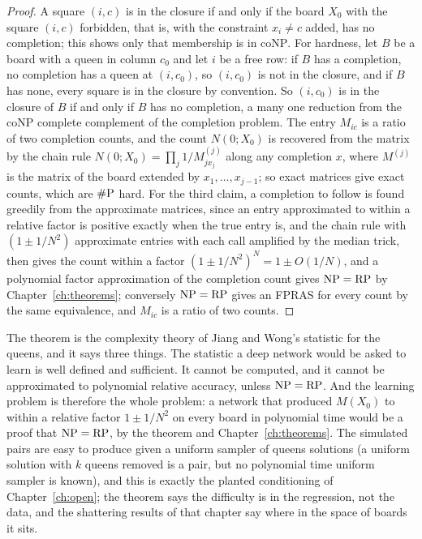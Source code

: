 \begin{proof}
A square $(i, c)$ is in the closure if and only if the board $X_0$ with the square $(i, c)$ forbidden, that is, with the constraint $x_i \ne c$ added, has no completion; this shows only that membership is in $\mathrm{coNP}$. For hardness, let $B$ be a board with a queen in column $c_0$ and let $i$ be a free row: if $B$ has a completion, no completion has a queen at $(i, c_0)$, so $(i, c_0)$ is not in the closure, and if $B$ has none, every square is in the closure by convention. So $(i, c_0)$ is in the closure of $B$ if and only if $B$ has no completion, a many one reduction from the $\mathrm{coNP}$ complete complement of the completion problem. The entry $M_{ic}$ is a ratio of two completion counts, and the count $N(0; X_0)$ is recovered from the matrix by the chain rule $N(0; X_0) = \prod_j 1 / M^{(j)}_{j x_j}$ along any completion $x$, where $M^{(j)}$ is the matrix of the board extended by $x_1, \dots, x_{j-1}$; so exact matrices give exact counts, which are $\#\mathrm{P}$ hard. For the third claim, a completion to follow is found greedily from the approximate matrices, since an entry approximated to within a relative factor is positive exactly when the true entry is, and the chain rule with $(1 \pm 1/N^2)$ approximate entries with each call amplified by the median trick, then gives the count within a factor $(1 \pm 1/N^2)^{N} = 1 \pm O(1/N)$, and a polynomial factor approximation of the completion count gives $\mathrm{NP} = \mathrm{RP}$ by Chapter~\ref{ch:theorems}; conversely $\mathrm{NP} = \mathrm{RP}$ gives an FPRAS for every count by the same equivalence, and $M_{ic}$ is a ratio of two counts.
\end{proof}

The theorem is the complexity theory of Jiang and Wong's statistic for the queens, and it says three things. The statistic a deep network would be asked to learn is well defined and sufficient. It cannot be computed, and it cannot be approximated to polynomial relative accuracy, unless $\mathrm{NP} = \mathrm{RP}$. And the learning problem is therefore the whole problem: a network that produced $M(X_0)$ to within a relative factor $1 \pm 1/N^2$ on every board in polynomial time would be a proof that $\mathrm{NP} = \mathrm{RP}$, by the theorem and Chapter~\ref{ch:theorems}. The simulated pairs are easy to produce given a uniform sampler of queens solutions (a uniform solution with $k$ queens removed is a pair, but no polynomial time uniform sampler is known), and this is exactly the planted conditioning of Chapter~\ref{ch:open}; the theorem says the difficulty is in the regression, not the data, and the shattering results of that chapter say where in the space of boards it sits.

